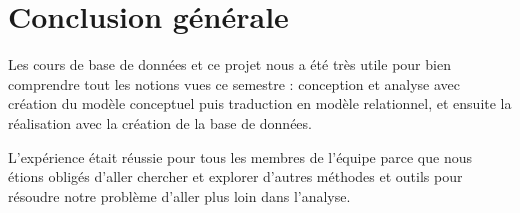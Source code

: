 \chapter{Conclusion générale} \label{Chapter5}

Les cours de base de données et ce projet nous a été très utile pour bien comprendre tout les notions vues ce semestre : conception et analyse avec création du modèle conceptuel puis traduction en modèle relationnel, et ensuite la réalisation avec la création de la base de données.

L’expérience était réussie pour tous les membres de l’équipe parce que nous étions obligés d’aller chercher et explorer d’autres méthodes et outils pour résoudre notre problème d’aller plus loin dans l’analyse.
